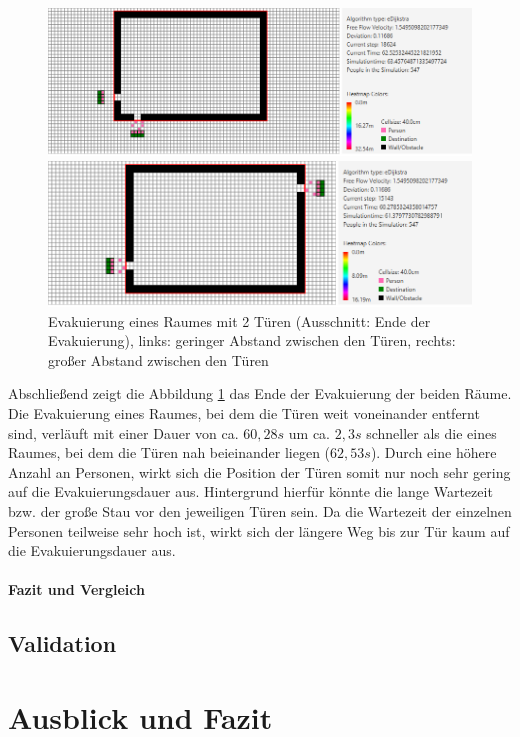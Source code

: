 \begin{figure}[!htb]
	\centering
	\begin{minipage}{.5\textwidth}
		\centering
		\includegraphics[width=\textwidth]{abbildungen/Evak2TMinDis2ENDE.png}
	\end{minipage}%
	\begin{minipage}{0.5\textwidth}
		\centering
		\includegraphics[width=\textwidth]{abbildungen/Evak2TMaxDis2ENDE.png}
	\end{minipage}
	\caption{Evakuierung eines Raumes mit 2 Türen (Ausschnitt: Ende der Evakuierung), links: geringer Abstand zwischen den Türen, rechts: großer Abstand zwischen den Türen}
	\label{fig:Evak2TminmaxDis2ENDE}
\end{figure}

Abschließend zeigt die Abbildung \ref{fig:Evak2TminmaxDis2ENDE} das Ende der Evakuierung der beiden Räume. Die Evakuierung eines Raumes, bei dem die Türen weit voneinander entfernt sind, verläuft mit einer Dauer von ca. $60,28s$ um ca. $2,3s$ schneller als die eines Raumes, bei dem die Türen nah beieinander liegen ($62,53s$). Durch eine höhere Anzahl an Personen, wirkt sich die Position der Türen somit nur noch sehr gering auf die Evakuierungsdauer aus. Hintergrund hierfür könnte die lange Wartezeit bzw. der große Stau vor den jeweiligen Türen sein. Da die Wartezeit der einzelnen Personen teilweise sehr hoch ist, wirkt sich der längere Weg bis zur Tür kaum auf die Evakuierungsdauer aus.
 
\paragraph{Fazit und Vergleich}

\subsection{Validation}

\section{Ausblick und Fazit}

%




